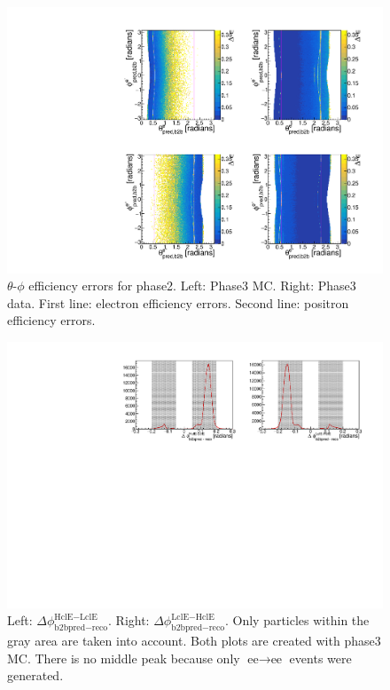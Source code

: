 \documentclass[a4paper,11pt,twosided,final,german,openbib,pdftex,listof=totoc,bibliography=totoc]{scrbook}
\begin{document}
\begin{appendix}
\begin{figure}[!htbp]
	\centering
	\includegraphics[width=\textwidth]{Plots/master3/xCEffTP_MCData_ErrorP3.pdf}
	\caption[$\theta$-$\phi$ Efficiency Error Plots Phase3]{$\theta$-$\phi$ efficiency errors for phase2. Left: Phase3 MC. Right: Phase3 data. First line: electron efficiency errors. Second line: positron efficiency errors.}
	\label{plt:xCEff_ErrorP3}
\end{figure}








\begin{figure}[h!]
	\centering
	\includegraphics[width=\textwidth]{Plots/master3/hb2b_MCP3.pdf}
	\caption[b2bClusterPhi - clusterPhi For Phase3 MC]{Left: $\Delta \phi _{\textrm{b2bpred} - \textrm{reco}}^{\textrm{HclE}-\textrm{LclE}}$. Right:  $\Delta \phi _{\textrm{b2bpred} - \textrm{reco}}^{\textrm{LclE}-\textrm{HclE}}$. Only particles within the gray area are taken into account. Both plots are created with phase3 MC. There is no middle peak because only $\textrm{ee} \rightarrow \textrm{ee}$ events were generated.}
	\label{fig:b2bMC3}
\end{figure}





\end{appendix}
\end{document}
